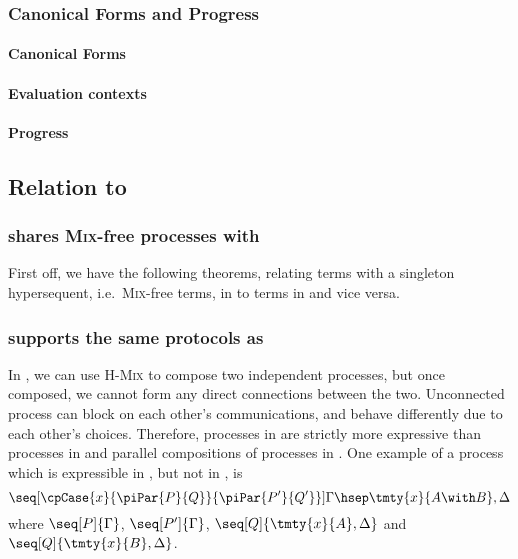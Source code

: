 \documentclass{article}
\begin{document}
\subsubsection{Canonical Forms and Progress}\label{sec:hcp-canonical-forms-and-progress}

\paragraph{Canonical Forms}\label{sec:hcp-canonical-forms}


\paragraph{Evaluation contexts}



\paragraph{Progress}


\subsection{Relation to \cp}\label{sec:hcp2cp}

\subsubsection{\hcp shares \textsc{Mix}-free processes with \cp}
First off, we have the following theorems, relating terms with a singleton
hypersequent, i.e.\ \textsc{Mix}-free terms, in \hcp to terms in \cp and vice
versa.







\subsubsection{\hcp supports the same protocols as \cp}
In \hcp, we can use \textsc{H-Mix} to compose two independent processes, but
once composed, we cannot form any direct connections between the two.
Unconnected process can block on each other's communications, and behave
differently due to each other's choices.
Therefore, processes in \hcp are strictly more expressive than processes in \cp
and parallel compositions of processes in \cp.
One example of a process which is expressible in \hcp, but not in \cp, is
$$
\seq[{
  \cpCase{x}{\piPar{P}{Q}}{\piPar{P'}{Q'}}
}]{
  \Gamma \hsep \tmty{x}{A \with B}, \Delta
}
$$
where $\seq[P]{\Gamma}$, $\seq[P']{\Gamma}$, $\seq[Q]{\tmty{x}{A}, \Delta}$ and
$\seq[Q]{\tmty{x}{B}, \Delta}$.
\end{document}
